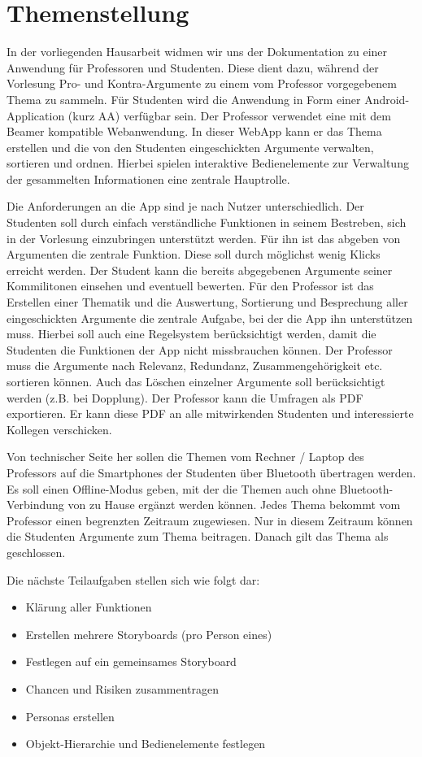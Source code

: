 \chapter{Themenstellung}
\label{chap:intro}

In der vorliegenden Hausarbeit widmen wir uns der Dokumentation zu einer Anwendung für Professoren und Studenten. Diese dient dazu, während der Vorlesung Pro- und Kontra-Argumente zu einem vom Professor vorgegebenem Thema zu sammeln. 
Für Studenten wird die Anwendung in Form einer Android-Application (kurz AA) verfügbar sein. Der Professor verwendet eine mit dem Beamer kompatible Webanwendung. In dieser WebApp kann er  das Thema erstellen und die von den Studenten eingeschickten Argumente verwalten, sortieren und ordnen.
Hierbei spielen interaktive Bedienelemente zur Verwaltung der gesammelten Informationen eine zentrale Hauptrolle. 

Die Anforderungen an die App sind je nach Nutzer unterschiedlich. Der Studenten soll durch einfach verständliche Funktionen in seinem Bestreben, sich in der Vorlesung einzubringen unterstützt werden. Für ihn ist das abgeben von Argumenten die zentrale Funktion. Diese soll durch möglichst wenig Klicks erreicht werden. Der Student kann die bereits abgegebenen Argumente seiner Kommilitonen einsehen und eventuell bewerten. 
Für den Professor ist das Erstellen einer Thematik und die Auswertung, Sortierung und Besprechung aller eingeschickten Argumente die zentrale Aufgabe, bei der die App ihn unterstützen muss. Hierbei soll auch eine Regelsystem berücksichtigt werden, damit  die Studenten die Funktionen der App nicht missbrauchen können. Der Professor muss die Argumente nach Relevanz, Redundanz, Zusammengehörigkeit etc. sortieren können. Auch das Löschen einzelner Argumente soll berücksichtigt werden (z.B. bei Dopplung). Der Professor kann die Umfragen als PDF exportieren. Er kann diese PDF an alle mitwirkenden Studenten und interessierte Kollegen verschicken. 

Von technischer Seite her sollen die Themen vom Rechner / Laptop des Professors auf die Smartphones der Studenten über Bluetooth übertragen werden. Es soll einen Offline-Modus geben, mit der die Themen auch ohne Bluetooth-Verbindung von zu Hause ergänzt werden können. 
Jedes Thema bekommt vom Professor einen begrenzten Zeitraum zugewiesen. Nur in diesem Zeitraum können die Studenten Argumente zum Thema beitragen. Danach gilt das Thema als geschlossen.

Die nächste Teilaufgaben stellen sich wie folgt dar:
\begin{itemize}
\item Klärung aller Funktionen
\item Erstellen mehrere Storyboards (pro Person eines)
\item Festlegen auf ein gemeinsames Storyboard
\item Chancen und Risiken zusammentragen
\item Personas erstellen
\item Objekt-Hierarchie und Bedienelemente festlegen
\end{itemize}

 

